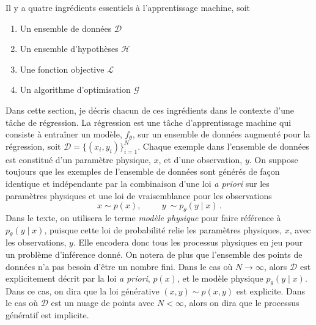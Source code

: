 Il y a quatre ingrédients essentiels à l'apprentissage machine, soit
\begin{enumerate}
        \item Un ensemble de données $\mathcal{D}$
        \item Un ensemble d'hypothèses $\mathcal{H}$
        \item Une fonction objective $\mathcal{L}$
        \item Un algorithme d'optimisation $\mathcal{G}$
\end{enumerate}
Dans cette section, je décris chacun de ces ingrédients dans le contexte d'une tâche de régression.
La régression est une tâche d'apprentissage machine qui consiste à entraîner un modèle, $f_{\theta}$, sur un ensemble de données augmenté pour la régression, soit 
$\mathcal{D} = \{(x_i, y_i)\}_{i=1}^N$. Chaque exemple dans l'ensemble de données est constitué d'un paramètre physique, $x$, et d'une observation, $y$. 
On suppose toujours que les exemples de l'ensemble de données sont générés de façon identique et indépendante par la combinaison 
d'une loi \textit{a priori} sur les paramètres physiques et une loi de vraisemblance pour les observations
\begin{equation}
                x \sim p(x),  \hspace{1cm} y\ \sim p_\theta(y \mid x) \, . 
\end{equation}
Dans le texte, on utilisera le terme \textit{modèle physique} pour faire référence à $p_\theta(y \mid x)$, puisque cette loi de probabilité relie les paramètres physiques, $x$, 
avec les observations, $y$. Elle encodera donc tous les processus physiques en jeu pour un problème d'inférence donné.
On notera de plus que l'ensemble des points de données n'a pas besoin d'être un nombre fini. Dans le cas où $N \rightarrow  \infty$, alors 
$\mathcal{D}$ est explicitement décrit par la loi \textit{a priori}, $p(x)$, et le modèle physique $p_\theta(y \mid x)$. 
Dans ce cas, on dira que la loi générative $(x, y) \sim p(x, y)$ est explicite. 
Dans le cas où $\mathcal{D}$ est un nuage de points avec $N < \infty$, alors on dira que le processus génératif est implicite. 

